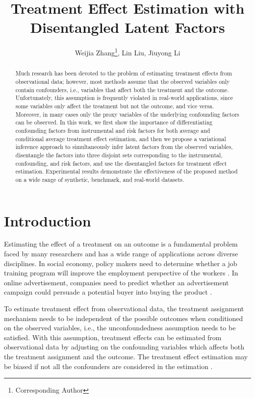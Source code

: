 \documentclass[letterpaper]{article} %
\title{Treatment Effect Estimation with Disentangled Latent Factors}
\author {
Weijia Zhang\footnote{Corresponding Author},
Lin Liu,
Jiuyong Li \\
}
\begin{document}
\maketitle

\begin{abstract}
Much research has been devoted to the problem of estimating treatment effects from observational data; however, most methods assume that the observed variables only contain confounders, i.e., variables that affect both the treatment and the outcome. Unfortunately, this assumption is frequently violated in real-world applications, since some variables only affect the treatment but not the outcome, and vice versa. Moreover, in many cases only the proxy variables of the underlying confounding factors can be observed.
In this work, we first show the importance of differentiating confounding factors from instrumental and risk factors for both average and conditional average treatment effect estimation, and then we propose a variational inference approach to simultaneously infer latent factors from the observed variables, disentangle the factors into three disjoint sets corresponding to the instrumental, confounding, and risk factors, and use the disentangled factors for treatment effect estimation.
Experimental results demonstrate the effectiveness of the proposed method on a wide range of synthetic, benchmark, and real-world datasets.
\end{abstract}

\section*{Introduction}
Estimating the effect of a treatment on an outcome is a fundamental problem faced by many researchers and has a wide range of applications across diverse disciplines.
In social economy, policy makers need to determine whether a job training program will improve the employment perspective of the workers \cite{Athey2015}.
In online advertisement, companies need to predict whether an advertisement campaign could persuade a potential buyer into buying the product \cite{Rzepakowski2011}.


To estimate treatment effect from observational data, the treatment assignment mechanism needs to be independent of the possible outcomes when conditioned on the observed variables, i.e., the unconfoundedness assumption \cite{Rosenbaum1983} needs to be satisfied. With this assumption, treatment effects can be estimated from observational data by adjusting on the confounding variables which affects both the treatment assignment and the outcome. The treatment effect estimation may be biased if not all the confounders are considered in the estimation \cite{Pearl2009}.
\end{document}
